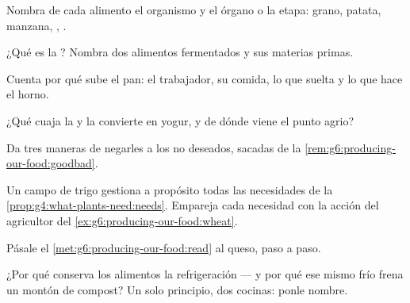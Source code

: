 \begin{exercise}[$\star$]\label{exo:g6:producing-our-food:2}
Nombra de cada alimento el organismo y el órgano o la etapa: grano,
patata, manzana, , .
\end{exercise}

\begin{exercise}[$\star$]\label{exo:g6:producing-our-food:3}
¿Qué es la ? Nombra dos alimentos fermentados y sus
materias primas.
\end{exercise}

\begin{exercise}[$\star$]\label{exo:g6:producing-our-food:4}
Cuenta por qué sube el pan: el trabajador, su comida, lo que suelta y
lo que hace el horno.
\end{exercise}

\begin{exercise}[$\star$]\label{exo:g6:producing-our-food:5}
¿Qué cuaja la  y la convierte en yogur, y de dónde viene el punto
agrio?
\end{exercise}

\begin{exercise}[$\star$]\label{exo:g6:producing-our-food:6}
Da tres maneras de negarles  a los  no deseados,
sacadas de la \cref{rem:g6:producing-our-food:goodbad}.
\end{exercise}

\begin{exercise}[$\star\star$]\label{exo:g6:producing-our-food:7}
Un campo de trigo gestiona a propósito todas las necesidades de la
\cref{prop:g4:what-plants-need:needs}. Empareja cada necesidad con la
acción del agricultor del \cref{ex:g6:producing-our-food:wheat}.
\end{exercise}

\begin{exercise}[$\star\star$]\label{exo:g6:producing-our-food:8}
Pásale el \cref{met:g6:producing-our-food:read} al queso, paso a paso.
\end{exercise}

\begin{exercise}[$\star\star$]\label{exo:g6:producing-our-food:9}
¿Por qué conserva los alimentos la refrigeración --- y por qué ese
mismo frío frena un montón de compost? Un solo principio, dos cocinas:
ponle nombre.
\end{exercise}

